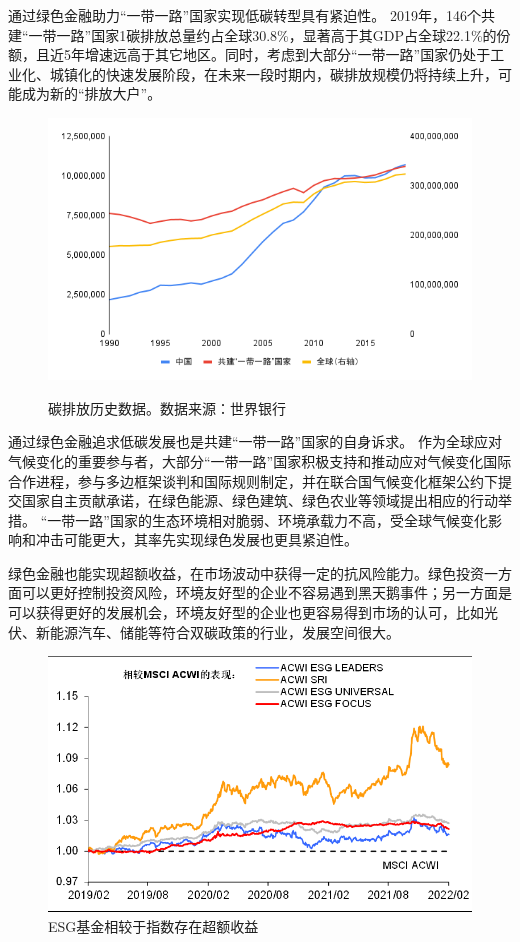 \documentclass[a4paper,12pt]{ctexart}
\begin{document}
通过绿色金融助力“一带一路”国家实现低碳转型具有紧迫性。
2019年，146个共建“一带一路”国家1碳排放总量约占全球30.8\%，显著高于其GDP占全球22.1\%的份额，且近5年增速远高于其它地区。同时，考虑到大部分“一带一路”国家仍处于工业化、城镇化的快速发展阶段，在未来一段时期内，碳排放规模仍将持续上升，可能成为新的“排放大户”。
\begin{figure}[H]
    \centering
    \includegraphics[width=0.8\linewidth]{./img/碳排放-折线图.png}
    \label{fig:carbonemit2}
    \caption{碳排放历史数据。数据来源：世界银行}
\end{figure}

通过绿色金融追求低碳发展也是共建“一带一路”国家的自身诉求。
作为全球应对气候变化的重要参与者，大部分“一带一路”国家积极支持和推动应对气候变化国际合作进程，参与多边框架谈判和国际规则制定，并在联合国气候变化框架公约下提交国家自主贡献承诺，在绿色能源、绿色建筑、绿色农业等领域提出相应的行动举措。
“一带一路”国家的生态环境相对脆弱、环境承载力不高，受全球气候变化影响和冲击可能更大，其率先实现绿色发展也更具紧迫性。

绿色金融也能实现超额收益，在市场波动中获得一定的抗风险能力。绿色投资一方面可以更好控制投资风险，环境友好型的企业不容易遇到黑天鹅事件；另一方面是可以获得更好的发展机会，环境友好型的企业也更容易得到市场的认可，比如光伏、新能源汽车、储能等符合双碳政策的行业，发展空间很大。
\begin{figure}[H]
    \includegraphics[width=0.8\linewidth]{img/超额收益.png}
    \caption{ESG基金相较于指数存在超额收益}
\end{figure}
\end{document}
